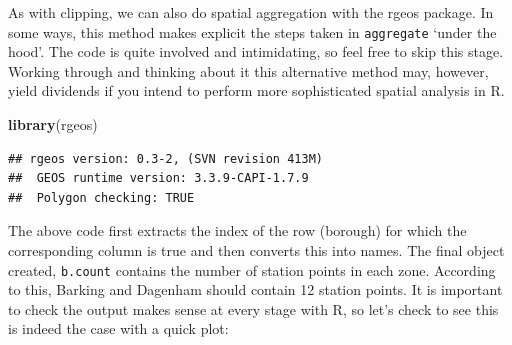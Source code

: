 \documentclass[]{article}
\newenvironment{Shaded}{}{}
\newcommand{\KeywordTok}[1]{\textcolor[rgb]{0.00,0.44,0.13}{\textbf{{#1}}}}
\newcommand{\DataTypeTok}[1]{\textcolor[rgb]{0.56,0.13,0.00}{{#1}}}
\newcommand{\DecValTok}[1]{\textcolor[rgb]{0.25,0.63,0.44}{{#1}}}
\newcommand{\StringTok}[1]{\textcolor[rgb]{0.25,0.44,0.63}{{#1}}}
\newcommand{\CommentTok}[1]{\textcolor[rgb]{0.38,0.63,0.69}{\textit{{#1}}}}
\newcommand{\OtherTok}[1]{\textcolor[rgb]{0.00,0.44,0.13}{{#1}}}
\newcommand{\NormalTok}[1]{{#1}}
\begin{document}
As with clipping, we can also do spatial aggregation with the rgeos
package. In some ways, this method makes explicit the steps taken in
\texttt{aggregate} `under the hood'. The code is quite involved and
intimidating, so feel free to skip this stage. Working through and
thinking about it this alternative method may, however, yield dividends
if you intend to perform more sophisticated spatial analysis in R.

\begin{Shaded}
\begin{Highlighting}[]
\KeywordTok{library}\NormalTok{(rgeos)}
\end{Highlighting}
\end{Shaded}

\begin{verbatim}
## rgeos version: 0.3-2, (SVN revision 413M)
##  GEOS runtime version: 3.3.9-CAPI-1.7.9 
##  Polygon checking: TRUE
\end{verbatim}

\begin{Shaded}
\end{Shaded}

The above code first extracts the index of the row (borough) for which
the corresponding column is true and then converts this into names. The
final object created, \texttt{b.count} contains the number of station
points in each zone. According to this, Barking and Dagenham should
contain 12 station points. It is important to check the output makes
sense at every stage with R, so let's check to see this is indeed the
case with a quick plot:

\begin{Shaded}
\end{Shaded}
\end{document}
